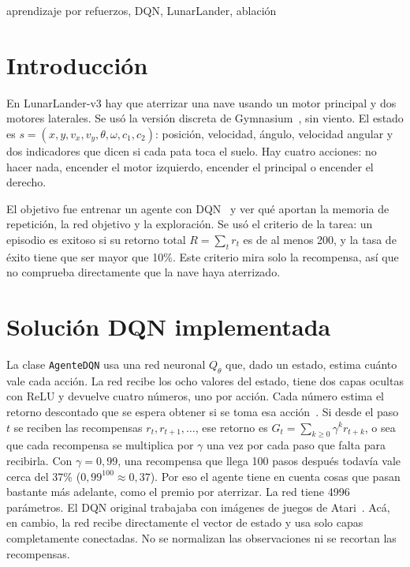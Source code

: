 \documentclass[conference]{IEEEtran}
\begin{document}
\begin{IEEEkeywords}
aprendizaje por refuerzos, DQN, LunarLander, ablación
\end{IEEEkeywords}

\section{Introducción}
En LunarLander-v3 hay que aterrizar una nave usando un motor principal y dos motores laterales. Se usó la versión discreta de Gymnasium~\cite{towers2024}, sin viento. El estado es $s=(x,y,v_x,v_y,\theta,\omega,c_1,c_2)$: posición, velocidad, ángulo, velocidad angular y dos indicadores que dicen si cada pata toca el suelo. Hay cuatro acciones: no hacer nada, encender el motor izquierdo, encender el principal o encender el derecho.

El objetivo fue entrenar un agente con DQN~\cite{mnih2015} y ver qué aportan la memoria de repetición, la red objetivo y la exploración. Se usó el criterio de la tarea: un episodio es exitoso si su retorno total $R=\sum_t r_t$ es de al menos 200, y la tasa de éxito tiene que ser mayor que 10\%. Este criterio mira solo la recompensa, así que no comprueba directamente que la nave haya aterrizado.

\section{Solución DQN implementada}
\label{sec:dqn}
La clase \texttt{AgenteDQN} usa una red neuronal $Q_\theta$ que, dado un estado, estima cuánto vale cada acción. La red recibe los ocho valores del estado, tiene dos capas ocultas con ReLU y devuelve cuatro números, uno por acción. Cada número estima el retorno descontado que se espera obtener si se toma esa acción~\cite{sutton2018}. Si desde el paso $t$ se reciben las recompensas $r_t,r_{t+1},\dots$, ese retorno es $G_t=\sum_{k\geq0}\gamma^k r_{t+k}$, o sea que cada recompensa se multiplica por $\gamma$ una vez por cada paso que falta para recibirla. Con $\gamma=0{,}99$, una recompensa que llega 100 pasos después todavía vale cerca del 37\% ($0{,}99^{100}\approx0{,}37$). Por eso el agente tiene en cuenta cosas que pasan bastante más adelante, como el premio por aterrizar. La red tiene 4996 parámetros. El DQN original trabajaba con imágenes de juegos de Atari~\cite{mnih2015}. Acá, en cambio, la red recibe directamente el vector de estado y usa solo capas completamente conectadas. No se normalizan las observaciones ni se recortan las recompensas.
\end{document}
